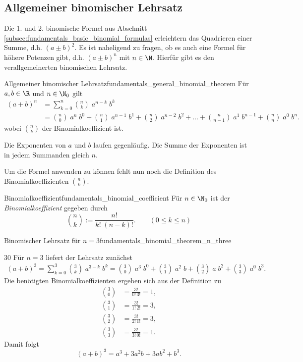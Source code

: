 \subsection{Allgemeiner binomischer Lehrsatz}
\label{subsec:fundamentals_general_binomial_theorem}

Die 1. und 2. binomische Formel aus Abschnitt \ref{subsec:fundamentals_basic_binomial_formulas}
erleichtern das Quadrieren einer Summe, d.h. $(a \pm b)^2$. Es ist naheligend zu fragen, ob es
auch eine Formel für höhere Potenzen gibt, d.h. $(a \pm b)^n$ mit $n\in\N$. Hierfür gibt es den
verallgemeinerten binomischen Lehrsatz.


\begin{TheoremBox}{Allgemeiner binomischer Lehrsatz}{fundamentals_general_binomial_theorem}
  Für $a,b\in\R$ und $n\in\N_0$ gilt
  \begin{align*}
    (a+b)^n
      &=\sum_{k=0}^{n}\binom{n}{k}\;a^{n-k}\;b^k \\
      &=\binom{n}{0}\;a^n\;b^0
        +\binom{n}{1}\;a^{n-1}\;b^1
        +\binom{n}{2}\;a^{n-2}\;b^2
        +\dots
        +\binom{n}{n-1}\;a^1\;b^{n-1}
        +\binom{n}{n}\;a^0\;b^n.
  \end{align*}
  wobei $\binom{n}{k}$ der Binomialkoeffizient ist.
\end{TheoremBox}
Die Exponenten von \(a\) und \(b\) laufen gegenläufig. Die Summe der Exponenten ist in jedem Summanden gleich \(n\).

Um die Formel anwenden zu können fehlt nun noch die Definition des Binomialkoeffizienten $\binom{n}{k}$.
\begin{DefinitionBox}{Binomialkoeffizient}{fundamentals_binomial_coefficient}
  Für $n\in\N_0$ ist der \emph{Binomialkoeffizient}  gegeben durch
  \[
    \binom{n}{k} := \frac{n!}{k! \; (n-k)!}.
    \qquad (0 \leq k \leq n)
  \]
\end{DefinitionBox}



\begin{ExampleBox}{Binomischer Lehrsatz für $n=3$}{fundamentals_binomial_theorem_n_three}
  \begin{ClozeArea}[34]{30}
  Für $n=3$ liefert der Lehrsatz zunächst
  \begin{align*}
      (a+b)^3
      =\sum_{k=0}^{3}\binom{3}{k} \; a^{3-k} \; b^k
      =\binom{3}{0} \; a^3 \; b^0 + \binom{3}{1} \; a^2 \; b + \binom{3}{2} \; a \; b^2 + \binom{3}{3} \; a^0 \; b^3.
  \end{align*}
  Die benötigten Binomialkoeffizienten ergeben sich aus der Definition zu
    \begin{align*}
      \binom{3}{0}&=\frac{3!}{0!\,3!}=1, \\
      \binom{3}{1}&=\frac{3!}{1!\,2!}=3, \\
      \binom{3}{2}&=\frac{3!}{2!\,1!}=3, \\
      \binom{3}{3}&=\frac{3!}{3!\,0!}=1.
    \end{align*}
    Damit folgt
    \[
      (a+b)^3=a^3+3a^2b+3ab^2+b^3.
    \]
  \end{ClozeArea}
\end{ExampleBox}

